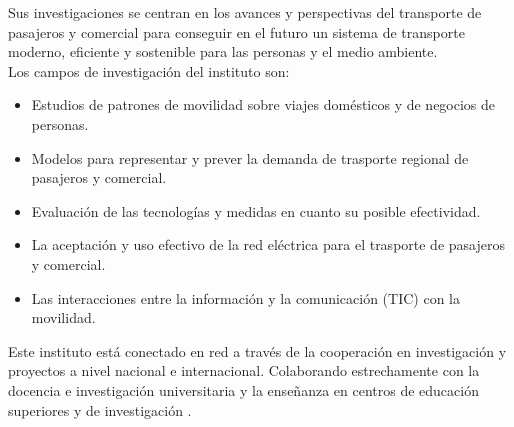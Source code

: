 Sus investigaciones se centran en los avances y perspectivas del transporte de pasajeros y comercial para conseguir en el futuro un sistema de transporte moderno, eficiente y sostenible para las personas y el medio ambiente.\\ 

Los campos de investigación del instituto son: 
\begin{itemize}
	\item Estudios de patrones de movilidad sobre viajes domésticos y de negocios de personas.
    \item Modelos para representar y prever la demanda de trasporte regional de pasajeros y comercial.
    \item Evaluación de las tecnologías y medidas en cuanto su posible efectividad.
    \item La aceptación y uso efectivo de la red eléctrica para el trasporte de pasajeros y comercial.
    \item Las interacciones entre la información y la comunicación (TIC) con la movilidad.
\end{itemize}

Este instituto está conectado en red a través de la cooperación en investigación y proyectos a nivel nacional e internacional. Colaborando estrechamente con la docencia e investigación universitaria y la enseñanza en centros de educación superiores y de investigación \cite{vfHome}.